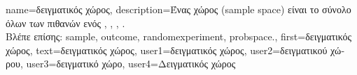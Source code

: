{name={\foreignlanguage{greek}{δειγματικός χώρος}}, 
  	description={\foreignlanguage{greek}{Ένας}  
		\foreignlanguage{greek}{χώρος} (sample space) \foreignlanguage{greek}{είναι το σύνολο όλων των πιθανών} 
		 \foreignlanguage{greek}{ενός}  \cite{BillingsleyProbMeasure}, 
		\cite{BertsekasProb}, \cite{papoulis}, \cite{AshProbMeasure}. 
		\\
 		\foreignlanguage{greek}{Βλέπε επίσης:} \gls{sample}, \gls{outcome}, \gls{randomexperiment}, \gls{probspace}.},  
  	first={\foreignlanguage{greek}{δειγματικός χώρος}}, 
  	text={\foreignlanguage{greek}{δειγματικός χώρος}}, 
	user1={\foreignlanguage{greek}{δειγματικός χώρος}}, %
  	user2={\foreignlanguage{greek}{δειγματικού χώρου}}, %
	user3={\foreignlanguage{greek}{δειγματικό χώρο}}, %
	user4={\foreignlanguage{greek}{Δειγματικός χώρος}} %
}

